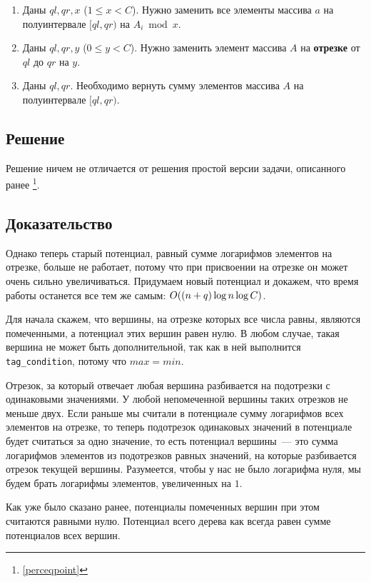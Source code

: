 \begin{enumerate}
    \item Даны $ql, qr, x$ ($1 \le x < C$). Нужно заменить все элементы массива $a$ на полуинтервале $[ql, qr)$ на $A_i \bmod x$.
    \item Даны $ql, qr, y$ ($0 \le y < C$). Нужно заменить элемент массива $A$ на \textbf{отрезке} от $ql$ до $qr$ на $y$.
    \item Даны $ql, qr$. Необходимо вернуть сумму элементов массива $A$ на полуинтервале $[ql, qr)$.
\end{enumerate}

\subsection{Решение}

Решение ничем не отличается от решения простой версии задачи, описанного ранее \footnote{\ref{perceqpoint}}.

\subsection{Доказательство}


Однако теперь старый потенциал, равный сумме логарифмов элементов на отрезке, больше не работает, потому что при присвоении на отрезке он может очень сильно увеличиваться. Придумаем новый потенциал и докажем, что время работы останется все тем же самым: $O((n + q) \log n \log C)$.

Для начала скажем, что вершины, на отрезке которых все числа равны, являются помеченными, а потенциал этих вершин равен нулю. В любом случае, такая вершина не может быть дополнительной, так как в ней выполнится \verb+tag_condition+, потому что $max = min$.

Отрезок, за который отвечает любая вершина разбивается на подотрезки с одинаковыми значениями. У любой непомеченной вершины таких отрезков не меньше двух. Если раньше мы считали в потенциале сумму логарифмов всех элементов на отрезке, то теперь подотрезок одинаковых значений в потенциале будет считаться за одно значение, то есть потенциал вершины~--- это сумма логарифмов элементов из подотрезков равных значений, на которые разбивается отрезок текущей вершины. Разумеется, чтобы у нас не было логарифма нуля, мы будем брать логарифмы элементов, увеличенных на $1$.

Как уже было сказано ранее, потенциалы помеченных вершин при этом считаются равными нулю.
Потенциал всего дерева как всегда равен сумме потенциалов всех вершин.

